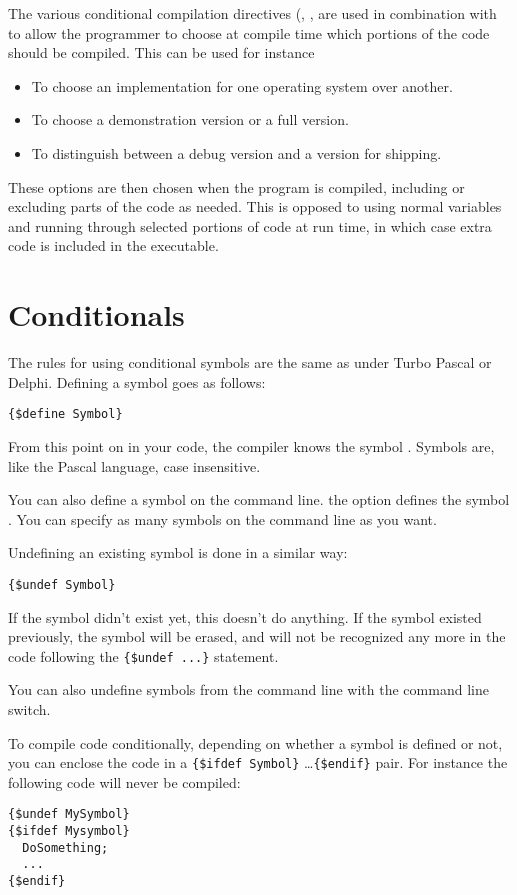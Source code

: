 The various conditional compilation directives (,  ,
 are used in combination with 
to allow the programmer to choose at compile time which portions 
of the code should be compiled.  This can be used for instance
\begin{itemize}
\item To choose an implementation for one operating system over another.
\item To choose a demonstration version or a full version.
\item To distinguish between a debug version and a version for shipping.
\end{itemize}
These options are then chosen when the program is compiled, including or
excluding parts of the code as needed. This is opposed to using normal 
variables and running through selected portions of code at run time,  
in which case extra code is included in the executable.

\section{Conditionals}
\label{se:Conditionals}
The rules for using conditional symbols are the same as under Turbo Pascal
or Delphi. Defining a symbol goes as follows:
\begin{verbatim}
{$define Symbol}
\end{verbatim}
From this point on in your code, the compiler knows the symbol .
Symbols are, like the Pascal language, case insensitive.

You can also define a symbol on the command line. the  option
defines the symbol . You can specify as many symbols on the
command line as you want.

Undefining an existing symbol is done in a similar way:
\begin{verbatim}
{$undef Symbol}
\end{verbatim}
If the symbol didn't exist yet, this doesn't do anything. If the symbol
existed previously, the symbol will be erased, and will not be recognized
any more in the code following the \verb|{$undef ...}| statement.

You can also undefine symbols from the command line with the 
command line switch.

To compile code conditionally, depending on whether a symbol is defined or
not, you can enclose the code in a \verb|{$ifdef Symbol}| \dots \verb|{$endif}|
pair. For instance the following code will never be compiled:
\begin{verbatim}
{$undef MySymbol}
{$ifdef Mysymbol}
  DoSomething;
  ...
{$endif}
\end{verbatim}

